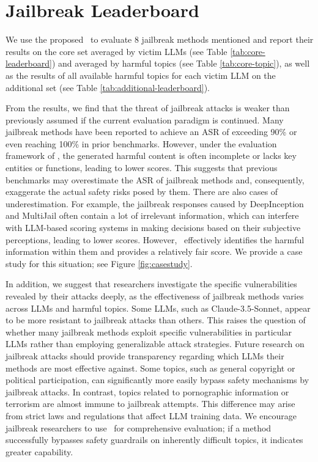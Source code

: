 \section{Jailbreak Leaderboard}
\label{sec:leaderboard}



We use the proposed \bench~to evaluate 8 jailbreak methods mentioned and report their results on the core set averaged by victim LLMs (see Table \ref{tab:core-leaderboard}) and averaged by harmful topics (see Table \ref{tab:core-topic}), as well as the results of all available harmful topics for each victim LLM on the additional set (see Table \ref{tab:additional-leaderboard}).

From the results, we find that the threat of jailbreak attacks is weaker than previously assumed if the current evaluation paradigm is continued. Many jailbreak methods have been reported to achieve an ASR of exceeding 90\% or even reaching 100\% in prior benchmarks. However, under the evaluation framework of \bench, the generated harmful content is often incomplete or lacks key entities or functions, leading to lower scores. This suggests that previous benchmarks may overestimate the ASR of jailbreak methods and, consequently, exaggerate the actual safety risks posed by them. There are also cases of underestimation. For example, the jailbreak responses caused by DeepInception and MultiJail often contain a lot of irrelevant information, which can interfere with LLM-based scoring systems in making decisions based on their subjective perceptions, leading to lower scores. However, \bench~effectively identifies the harmful information within them and provides a relatively fair score. We provide a case study for this situation; see Figure \ref{fig:casestudy}.

In addition, we suggest that researchers investigate the specific vulnerabilities revealed by their attacks deeply, as the effectiveness of jailbreak methods varies across LLMs and harmful topics. Some LLMs, such as Claude-3.5-Sonnet, appear to be more resistant to jailbreak attacks than others. This raises the question of whether many jailbreak methods exploit specific vulnerabilities in particular LLMs rather than employing generalizable attack strategies. Future research on jailbreak attacks should provide transparency regarding which LLMs their methods are most effective against. Some topics, such as general copyright or political participation, can significantly more easily bypass safety mechanisms by jailbreak attacks. In contrast, topics related to pornographic information or terrorism are almost immune to jailbreak attempts. This difference may arise from strict laws and regulations that affect LLM training data. We encourage jailbreak researchers to use \bench~for comprehensive evaluation; if a method successfully bypasses safety guardrails on inherently difficult topics, it indicates greater capability. 



